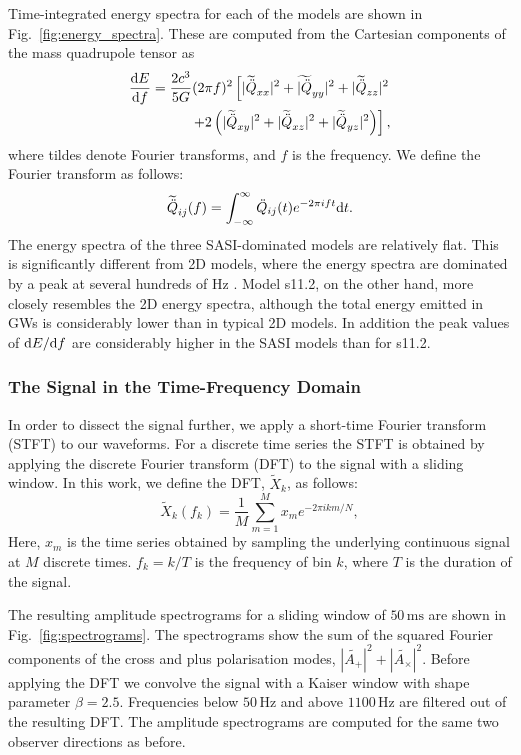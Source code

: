 Time-integrated energy spectra for each of the models are shown
in Fig.~\ref{fig:energy_spectra}. These are computed from
the Cartesian components of the mass quadrupole tensor as
\begin{eqnarray}
\frac{\mathrm{d} E}{\mathrm{d} f}=
\frac{2 c^3}{5 G} (2\pi f)^2\left[|\widetilde{\ddot{Q}}_{xx}|^2+\widetilde{|\ddot{Q}}_{yy}|^2+|\widetilde{\ddot{Q}}_{zz}|^2 \right. \nonumber \\ 
\left.+2\left ( |\widetilde{\ddot{Q}}_{xy}|^2 + |\widetilde{\ddot{Q}}_{xz}|^2+|\widetilde{\ddot{Q}}_{yz}|^2 \right )\right],
\end{eqnarray}
where tildes denote Fourier transforms, and $f$ is the
frequency. We define the Fourier transform as follows:
\begin{equation}
\widetilde{\ddot{Q}}_{ij}(f) = \int_{-\infty}^{\infty} \ddot{Q}_{ij}(t) e^{-2 \pi i f t} \mathrm{d} t. 
\end{equation}
The energy spectra of the three SASI-dominated models are relatively flat. This is significantly
different from 2D models, where the energy spectra
are dominated by a peak at several hundreds of $\mathrm{Hz}$
\citep{marek_08,mueller_13,yakunin_15}. Model s11.2, on the other hand, 
more closely resembles the 2D energy spectra, although
the total energy emitted in GWs is considerably lower than in typical 2D models. 
In addition the peak values of $\mathrm{d} E/\mathrm{d} f$
are considerably higher in the SASI models than for s11.2.

\subsubsection{The Signal in the Time-Frequency Domain}
In order to dissect the signal further, we apply a short-time
Fourier transform (STFT) to our waveforms. For a discrete time series
the STFT is obtained by applying the discrete Fourier transform (DFT)
to the signal with a sliding window.
In this work, we define the DFT, $\widetilde{X}_k$, as follows: 
\begin{equation} \label{eq:DFT}
\widetilde{X}_k (f_k) = \frac{1}{M}  \sum^M_{m=1} x_m e^{-2\pi i k m/N},
\end{equation}
Here, $x_m$ is the time series obtained by sampling the underlying continuous signal at $M$ discrete times. 
$f_k = k/T$ is the frequency of bin $k$, where $T$ is the duration of the signal.

The resulting amplitude spectrograms for a sliding window of $50 \, \mathrm{ms}$ are shown in
Fig.~\ref{fig:spectrograms}. The spectrograms show the sum of the squared Fourier
components of the cross and plus polarisation modes,
$|\widetilde{A_+}|^2 + |\widetilde{A_{\times}}|^2$. Before applying the
DFT we convolve the signal with a Kaiser window with shape parameter $\beta = 2.5$. Frequencies
below $50 \, \mathrm{Hz}$ and above $1100  \, \mathrm{Hz}$ are filtered out of the resulting DFT. The amplitude spectrograms are computed
for the same two observer directions as before.   

